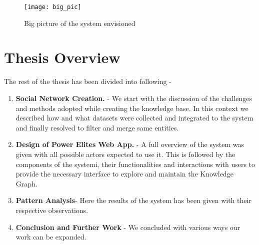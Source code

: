 \begin{figure}[here]
\begin{center}	
\texttt{[image: big\_pic]} 
\caption{Big picture of the system envisioned}
\label{fig:big_pic}
\end{center}
\end{figure}

\section{Thesis Overview}
The rest of the thesis has been divided into following -
\begin{enumerate}
    \item \textbf{Social Network Creation.} -  We start with the discussion of the challenges and methods adopted while  creating the knowledge base. In this context we described how and what datasets were collected and integrated to the system and finally resolved to filter and merge same entities.
    \item \textbf{Design of Power Elites Web App.}  -  A full overview of the system was given with all possible actors expected to use it. This is followed by the components  of the systemi, their functionalities and interactions with users to provide the necessary interface to explore and maintain the Knowledge Graph.

    \item \textbf{Pattern Analysis}- Here the results of the system has been given with their respective observations. 
    \item \textbf{Conclusion and Further Work} - We concluded with various ways our work can be expanded.

\end{enumerate}



%
%
